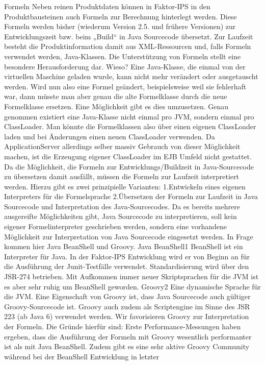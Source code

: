\documentclass[headsepline=true, footsepline=true]{scrartcl}
\begin{document}
Formeln Neben reinen Produktdaten können in Faktor-IPS in den Produktbausteinen
auch Formeln zur Berechnung hinterlegt werden. Diese Formeln werden bisher
(wiederum Version 2.5. und frühere Versionen) zur Entwicklungszeit bzw. beim
„Build“ in Java Sourcecode übersetzt. Zur Laufzeit besteht die Produktinformation
damit aus XML-Ressourcen und, falls Formeln verwendet werden, Java-Klassen. Die
Unterstützung von Formeln stellt eine besondere Herausforderung dar. Wieso? Eine
Java-Klasse, die einmal von der virtuellen Maschine geladen wurde, kann nicht
mehr verändert oder ausgetauscht werden. Wird nun also eine Formel geändert,
beispielsweise weil sie fehlerhaft war, dann müsste man aber genau die alte
Formelklasse durch die neue Formelklasse ersetzen. Eine Möglichkeit gibt es dies
umzusetzen. Genau genommen existiert eine Java-Klasse nicht einmal pro JVM,
sondern einmal pro ClassLoader. Man könnte die Formelklassen also über einen
eigenen ClassLoader laden und bei Änderungen einen neuen ClassLoader verwenden.
Da ApplicationServer allerdings selber massiv Gebrauch von dieser Möglichkeit
machen, ist die Erzeugung eigener ClassLoader im EJB Umfeld nicht gestattet. Da
die Möglichkeit, die Formeln zur Entwicklungs/Buildzeit in Java-Sourcecode zu
übersetzen damit ausfällt, müssen die Formeln zur Laufzeit interpretiert werden.
Hierzu gibt es zwei prinzipielle Varianten: 1.Entwickeln eines eigenen
Interpreters für die Formelsprache 2.Übersetzen der Formeln zur Laufzeit in Java
Sourcecode und Interpretation des Java-Sourcecodes. Da es bereits mehrere
ausgereifte Möglichkeiten gibt, Java Sourcecode zu interpretieren, soll kein
eigener Formelinterpreter geschrieben werden, sondern eine vorhandene Möglichkeit
zur Interpretation von Java Sourcecode eingesetzt werden. In Frage kommen hier
Java BeanShell und Groovy. Java BeanShell1 BeanShell ist ein Interpreter für
Java. In der Faktor-IPS Entwicklung wird er von Beginn an für die Ausführung der
Junit-Testfälle verwendet. Standardisierung wird über den JSR-274 betrieben. Mit
Aufkommen immer neuer Skriptsprachen für die JVM ist es aber sehr ruhig um
BeanShell geworden. Groovy2 Eine dynamische Sprache für die JVM. Eine Eigenschaft
von Groovy ist, dass Java Sourcecode auch gültiger Groovy-Sourcecode ist. Groovy
auch zudem als Scriptengine im Sinne des JSR 223 (ab Java 6) verwendet werden.
Wir favorisieren Groovy zur Interpretation der Formeln. Die Gründe hierfür sind:
Erste Performance-Messungen haben ergeben, dass die Ausführung der Formeln mit
Groovy wesentlich performanter ist als mit Java BeanShell. Zudem gibt es eine
sehr aktive Groovy Community während bei der BeanShell Entwicklung in letzter
\end{document}

